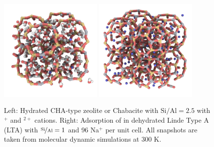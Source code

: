 \begin{figure}[ht]
	\begin{center}
            \centering
	    \includegraphics[width=0.45\textwidth]{./introduction/CHA_Na_Ca_water.png}
	    \includegraphics[width=0.45\textwidth]{./introduction/lta5a_co2.png}\\
	    \caption{
            Left: Hydrated CHA-type zeolite or Chabacite with $\text{Si}/\text{Al}=2.5$ with $^+$ and $^{2+}$ cations.
            Right: Adsorption of  in dehydrated Linde Type A (LTA) with $\nicefrac{\text{Si}}{\text{Al}}=1$ and 96 Na$^+$ per unit cell.
            All snapshots are taken from molecular dynamic simulations at 300 K.}
	    \label{fig:zeolites}
	\end{center}
\end{figure}

